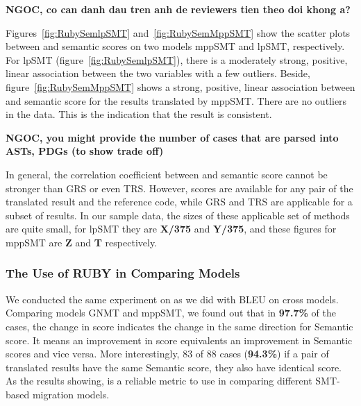 \textbf{NGOC, co can danh dau tren anh de reviewers tien theo doi khong a? }

Figures~\ref{fig:RubySemlpSMT} and~\ref{fig:RubySemMppSMT} show the
scatter plots between {\model} and semantic scores on two models mppSMT
and lpSMT, respectively. For lpSMT (figure~\ref{fig:RubySemlpSMT}), 
there is a moderately strong, positive, linear association between the 
two variables with a few outliers. Beside, figure~\ref{fig:RubySemMppSMT} 
shows a strong, positive, linear association between {\model} and semantic 
score for the results translated by mppSMT. There are no outliers in the data. 
This is the indication that the result is consistent.


\textbf{NGOC, you might provide the number of cases that are parsed into ASTs,
PDGs (to show trade off)}

In general, the correlation coefficient between {\model} and semantic score cannot be 
stronger than GRS or even TRS. However, {\model} scores are available for any pair 
of the translated result and the reference code, while GRS and TRS are applicable for 
a subset of results. In our sample data, the sizes of these applicable set of methods
are quite small, for lpSMT they are \textbf{X/375} and \textbf{Y/375}, and these figures
for mppSMT are \textbf{Z} and \textbf{T} respectively.


	    
\subsubsection{The Use of RUBY in Comparing Models}
We conducted the same experiment on {\model} as we did with BLEU on cross models. 
Comparing models GNMT and mppSMT, we found out that in \textbf{97.7\%} of the cases, the change in {\model} score indicates the change in the same direction for Semantic score. It means an improvement in {\model} score equivalents an improvement in Semantic scores and vice versa. More interestingly, 83 of 88 cases (\textbf{94.3\%}) if a pair of translated results have the same Semantic score, they also have identical {\model} score. 
As the results showing, {\model} is a reliable metric to use in comparing different SMT-based migration models. 	
